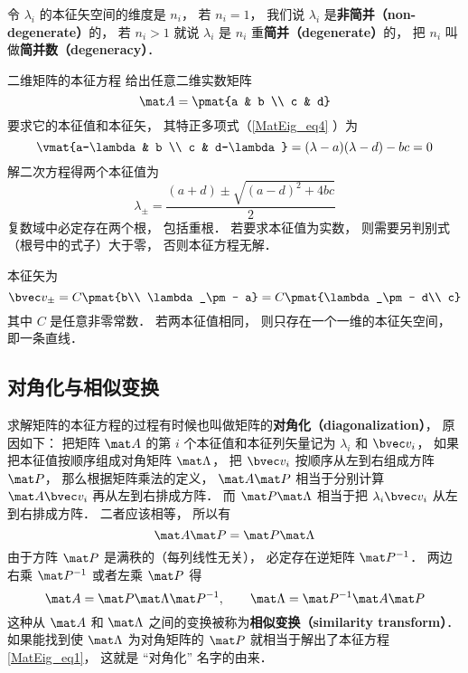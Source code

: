 令 $\lambda_i$ 的本征矢空间的维度是 $n_i$， 若 $n_i = 1$， 我们说 $\lambda_i$ 是\textbf{非简并（non-degenerate）}的， 若 $n_i > 1$ 就说 $\lambda_i$ 是 $n_i$ 重\textbf{简并（degenerate）}的， 把 $n_i$ 叫做\textbf{简并数（degeneracy）}．

\begin{example}{二维矩阵的本征方程}
给出任意二维实数矩阵
\begin{equation}
\mat A = \pmat{a & b \\ c & d}
\end{equation}
要求它的本征值和本征矢， 其特正多项式（\autoref{MatEig_eq4} ）为
\begin{equation}
\vmat{a-\lambda & b \\ c & d-\lambda} = (\lambda-a)(\lambda-d) - bc = 0
\end{equation}
解二次方程得两个本征值为
\begin{equation}
\lambda_\pm = \frac{(a + d) \pm \sqrt{(a-d)^2 + 4bc}}{2}
\end{equation}
复数域中必定存在两个根， 包括重根． 若要求本征值为实数， 则需要另判别式（根号中的式子）大于零， 否则本征方程无解．

本征矢为
\begin{equation}
\bvec v_\pm = C\pmat{b\\ \lambda_\pm - a} = C\pmat{\lambda_\pm - d\\ c}
\end{equation}
其中 $C$ 是任意非零常数． 若两本征值相同， 则只存在一个一维的本征矢空间， 即一条直线．
\end{example}

\subsection{对角化与相似变换}
求解矩阵的本征方程的过程有时候也叫做矩阵的\textbf{对角化（diagonalization）}， 原因如下： 把矩阵 $\mat A$ 的第 $i$ 个本征值和本征列矢量记为 $\lambda_i$ 和 $\bvec v_i$， 如果把本征值按顺序组成对角矩阵 $\mat \Lambda$， 把 $\bvec v_i$ 按顺序从左到右组成方阵 $\mat P$， 那么根据矩阵乘法的定义， $\mat A \mat P$ 相当于分别计算 $\mat A\bvec v_i$ 再从左到右排成方阵． 而 $\mat P\mat\Lambda$ 相当于把 $\lambda_i\bvec v_i$ 从左到右排成方阵． 二者应该相等， 所以有
\begin{equation}
\mat A \mat P = \mat P\mat\Lambda
\end{equation}
由于方阵 $\mat P$ 是满秩的（每列线性无关）， 必定存在逆矩阵%
$\mat P^{-1}$． 两边右乘 $\mat P^{-1}$ 或者左乘 $\mat P$ 得
\begin{equation}\label{MatEig_eq3}
\mat A = \mat P\mat\Lambda\mat P^{-1}, \qquad
\mat \Lambda = \mat P^{-1}\mat A \mat P
\end{equation}
这种从 $\mat A$ 和 $\mat\Lambda$ 之间的变换被称为\textbf{相似变换（similarity transform）}． 如果能找到使 $\mat\Lambda$ 为对角矩阵的 $\mat P$ 就相当于解出了本征方程\autoref{MatEig_eq1}， 这就是 “对角化” 名字的由来．
